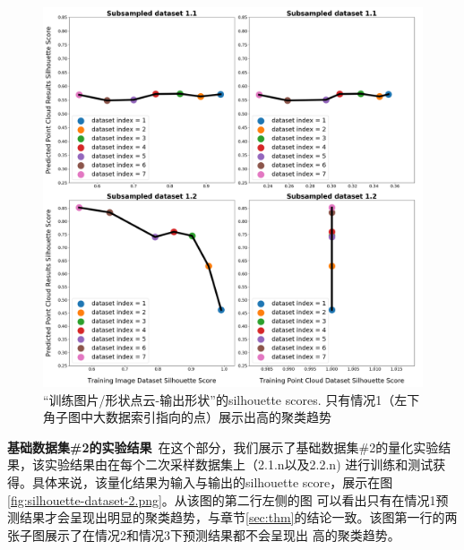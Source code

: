 \documentclass[bachelor, nocolorlinks, printoneside]{seuthesis} %
\begin{document}
\begin{Main}
\begin{figure}[h!]
    \centering
    \includegraphics[width=.95\textwidth]{figs/silhouette-dataset-1.png}
    \caption{\small “训练图片/形状点云-输出形状”的silhouette scores. 只有情况1（左下角子图中大数据索引指向的点）展示出高的聚类趋势}
    \label{fig:silhouette-dataset-1.png}
\end{figure}
\FloatBarrier
\textbf{基础数据集\#2的实验结果}~在这个部分，我们展示了基础数据集\#2的量化实验结果，该实验结果由在每个二次采样数据集上（2.1.n以及2.2.n)
进行训练和测试获得。具体来说，该量化结果为输入与输出的silhouette score，展示在图\ref{fig:silhouette-dataset-2.png}。从该图的第二行左侧的图
可以看出只有在情况1预测结果才会呈现出明显的聚类趋势，与章节\ref{sec:thm}的结论一致。该图第一行的两张子图展示了在情况2和情况3下预测结果都不会呈现出
高的聚类趋势。


\end{Main}
\end{document}
